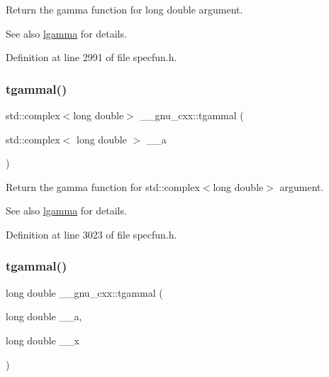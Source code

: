 Return the gamma function for {\ttfamily  long double } argument.

\begin{DoxySeeAlso}{See also}
\hyperlink{group__gnu__math__spec__func_ga40fa5127f7c419ed1d8f1c6a6f96ea9b}{lgamma} for details. 
\end{DoxySeeAlso}


Definition at line 2991 of file specfun.\+h.

\mbox{\label{group__gnu__math__spec__func_ga8d53515dba9c860fd6058a4b75aaff58}} 
\subsubsection{\texorpdfstring{tgammal()}{tgammal()}\hspace{0.1cm}{\footnotesize\ttfamily [2/3]}}
{\footnotesize\ttfamily std\+::complex$<$long double$>$ \+\_\+\+\_\+gnu\+\_\+cxx\+::tgammal (\begin{DoxyParamCaption}\item[{std\+::complex$<$ long double $>$}]{\+\_\+\+\_\+a }\end{DoxyParamCaption})\hspace{0.3cm}{\ttfamily [inline]}}

Return the gamma function for {\ttfamily  std\+::complex$<$long double$>$ } argument.

\begin{DoxySeeAlso}{See also}
\hyperlink{group__gnu__math__spec__func_ga40fa5127f7c419ed1d8f1c6a6f96ea9b}{lgamma} for details. 
\end{DoxySeeAlso}


Definition at line 3023 of file specfun.\+h.

\mbox{\label{group__gnu__math__spec__func_gabebff9ffba6acf55f3a3cd716ef5007a}} 
\subsubsection{\texorpdfstring{tgammal()}{tgammal()}\hspace{0.1cm}{\footnotesize\ttfamily [3/3]}}
{\footnotesize\ttfamily long double \+\_\+\+\_\+gnu\+\_\+cxx\+::tgammal (\begin{DoxyParamCaption}\item[{long double}]{\+\_\+\+\_\+a,  }\item[{long double}]{\+\_\+\+\_\+x }\end{DoxyParamCaption})\hspace{0.3cm}{\ttfamily [inline]}}

